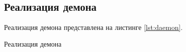 \subsection{Реализация демона}

Реализация демона представлена на листинге \ref{lst:daemon}.

\begin{longlisting}
	\singlespacing
	\caption{Реализация демона}
	\inputminted[frame=single,fontsize = \footnotesize, linenos, breaklines, xleftmargin = 1.5em,breaksymbol = ""]{c}{../lst/daemon.c}
	\label{lst:daemon}
\end{longlisting}

